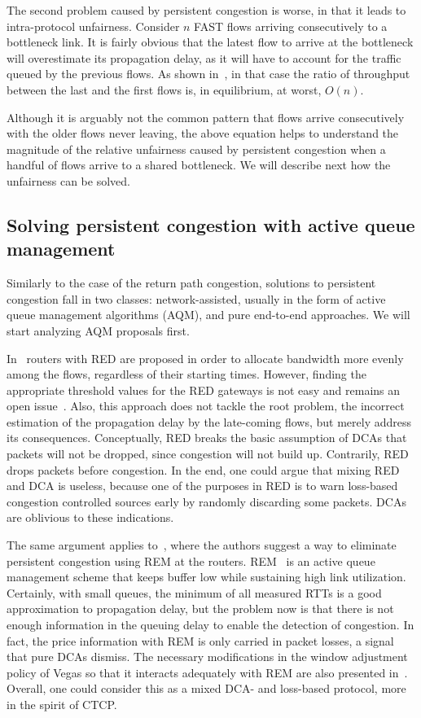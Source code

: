 \documentclass[english,times]{ettauth}
\begin{document}
The second problem caused by persistent congestion is worse, in that it leads
to intra-protocol unfairness. Consider $n$ FAST flows arriving consecutively
to a bottleneck link. It is fairly obvious that the latest flow to arrive at
the bottleneck will overestimate its propagation delay, as it will have to
account for the traffic queued by the previous flows. As shown
in~\cite{Rperez10}, in that case the ratio of throughput between the last and
the first flows is, in equilibrium, at worst, $O(n)$.

Although it is arguably not the common pattern that flows arrive consecutively
with the older flows never leaving, the above equation helps to understand the
magnitude of the relative unfairness caused by persistent congestion when a
handful of flows arrive to a shared bottleneck. We will describe next how the
unfairness can be solved.

\subsection{Solving persistent congestion with active queue management}
\label{sec:active-queue-manag}

Similarly to the case of the return path congestion, solutions to persistent
congestion fall in two classes: network-assisted, usually in the form of
active queue management algorithms (AQM), and pure end-to-end approaches. We
will start analyzing AQM proposals first.

In~\cite{La99} routers with RED are proposed in order to allocate bandwidth
more evenly among the flows, regardless of their starting times. However,
finding the appropriate threshold values for the RED gateways is not easy and
remains an open issue~\cite{Alemu04}. Also, this approach does not tackle the
root problem, the incorrect estimation of the propagation delay by the
late-coming flows, but merely address its consequences. Conceptually, RED
breaks the basic assumption of DCAs that packets will not be dropped, since
congestion will not build up. Contrarily, RED drops packets before congestion.
In the end, one could argue that mixing RED and DCA is useless, because one of
the purposes in RED is to warn loss-based congestion controlled sources early
by randomly discarding some packets. DCAs are oblivious to these indications.

The same argument applies to~\cite{Low02}, where the authors suggest a way to
eliminate persistent congestion using REM at the routers.
REM~\cite{Athuraliya01} is an active queue management scheme that keeps buffer
low while sustaining high link utilization. Certainly, with small queues, the
minimum of all measured RTTs is a good approximation to propagation delay, but
the problem now is that there is not enough information in the queuing delay
to enable the detection of congestion. In fact, the price information with REM
is only carried in packet losses, a signal that pure DCAs dismiss. The
necessary modifications in the window adjustment policy of Vegas so that it
interacts adequately with REM are also presented in~\cite{Low02}. Overall, one
could consider this as a mixed DCA- and loss-based protocol, more in the
spirit of CTCP.
\end{document}
